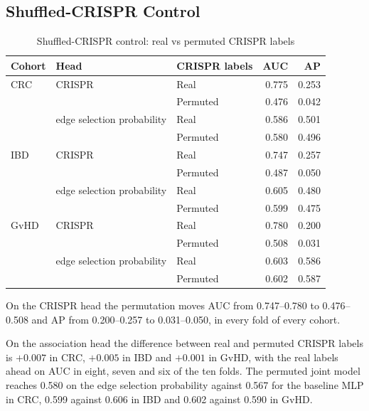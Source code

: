 \subsection{Shuffled-CRISPR Control}
\label{res:joint}

\begin{table}[htbp]
  \centering
  \caption{Shuffled-CRISPR control: real vs permuted CRISPR labels}
  \label{tab:shuffle-y}
  \begin{tabular}{lllrr}
    \hline
    Cohort & Head               & CRISPR labels & AUC   & AP    \\
    \hline
    CRC    & CRISPR             & Real       & 0.775 & 0.253 \\
           &                    & Permuted   & 0.476 & 0.042 \\
           & edge selection probability        & Real       & 0.586 & 0.501 \\
           &                    & Permuted   & 0.580 & 0.496 \\
    \hline
    IBD    & CRISPR             & Real       & 0.747 & 0.257 \\
           &                    & Permuted   & 0.487 & 0.050 \\
           & edge selection probability        & Real       & 0.605 & 0.480 \\
           &                    & Permuted   & 0.599 & 0.475 \\
    \hline
    GvHD   & CRISPR             & Real       & 0.780 & 0.200 \\
           &                    & Permuted   & 0.508 & 0.031 \\
           & edge selection probability        & Real       & 0.603 & 0.586 \\
           &                    & Permuted   & 0.602 & 0.587 \\
    \hline
  \end{tabular}
\end{table}

On the CRISPR head the permutation moves AUC from 0.747--0.780 to 0.476--0.508 and AP from 0.200--0.257
to 0.031--0.050, in every fold of every cohort.

On the association head the difference between real and permuted CRISPR labels is $+0.007$ in CRC,
$+0.005$ in IBD and $+0.001$ in GvHD, with the real labels ahead on AUC in eight, seven and six of the ten
folds. The permuted joint model reaches 0.580 on the edge selection probability against 0.567 for the baseline
 MLP in CRC, 0.599 against 0.606 in IBD and 0.602 against 0.590 in GvHD.

